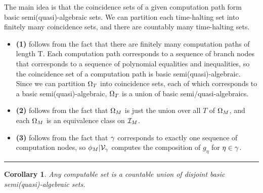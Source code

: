 \documentclass[twoside]{article}
\newtheorem{corollary}{Corollary}[section]
\newenvironment{proofsketch}{{\bf Proof Sketch:}}{\hfill\rule{2mm}{2mm}}
\begin{document}
  \begin{proofsketch}
    
    The main idea is that the coincidence sets of a given computation
    path form basic semi(quasi)-algebraic sets.  We can partition
    each time-halting set into finitely many coincidence sets, and
    there are countably many time-halting sets.

    \begin{itemize}
    \item \textbf{(1)} follows from the fact that there are finitely
      many computation paths of length T.  Each computation path
      corresponds to a sequence of branch nodes that corresponds to a
      sequence of polynomial equalities and inequalities, so the
      coincidence set of a computation path is basic
      semi(quasi)-algebraic. Since we can partition $\Omega_T$ into
      coincidence sets, each of which corresponds to a basic
      semi(quasi)-algebraic, $\Omega_T$ is a union of basic
      semi/quasi-algebraics.
    \item \textbf{(2)} follows from the fact that $\Omega_M$ is just
      the union over all $T$ of $\Omega_M$, and each $\Omega_M$ is
      an equivalence class on $\mathcal{I}_M$.
    \item \textbf{(3)} follows from the fact that $\gamma$
      corresponds to exactly one sequence of computation nodes, so
      $\phi_M|\mathcal{V}_{\gamma}$ computes the composition of
      $g_{\eta}$ for $\eta \in \gamma$.
    \end{itemize}
  \end{proofsketch}
  
  \begin{corollary}
    Any computable set is a countable union of disjoint basic
    semi(quasi)-algebraic sets.
  \end{corollary}
\end{document}
